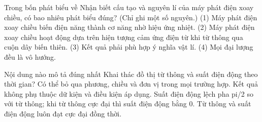 \begin{ex}
Trong bốn phát biểu về Nhận biết cấu tạo và nguyên lí của máy phát điện xoay chiều, có bao nhiêu phát biểu đúng? (Chỉ ghi một số nguyên.) (1) Máy phát điện xoay chiều biến điện năng thành cơ năng nhờ hiệu ứng nhiệt. (2) Máy phát điện xoay chiều hoạt động dựa trên hiện tượng cảm ứng điện từ khi từ thông qua cuộn dây biến thiên. (3) Kết quả phải phù hợp ý nghĩa vật lí. (4) Mọi đại lượng đều là vô hướng.
\end{ex}

\begin{ex}
Nội dung nào mô tả đúng nhất Khai thác đồ thị từ thông và suất điện động theo thời gian?
\choice
{Có thể bỏ qua phương, chiều và đơn vị trong mọi trường hợp.}
{Kết quả không phụ thuộc dữ kiện và điều kiện áp dụng.}
{\True Suất điện động lệch pha pi/2 so với từ thông; khi từ thông cực đại thì suất điện động bằng 0.}
{Từ thông và suất điện động luôn đạt cực đại đồng thời.}
\end{ex}

